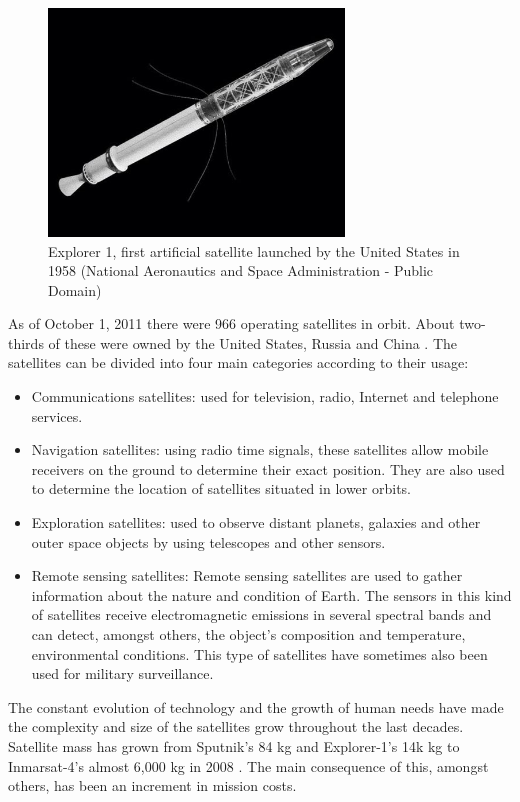 \begin{figure}[H]
\centerline{\includegraphics[width=0.7\textwidth]{images/explorer1.jpg}}
\caption{Explorer 1, first artificial satellite launched by the United States in 1958 (National Aeronautics and Space Administration - Public Domain)}
\label{f1.2}
\end{figure}
\pagebreak

As of October 1, 2011 there were 966 operating satellites in orbit. About two-thirds of these were owned by the United States, Russia and China \cite{SBFE}. The satellites can be divided into four main categories according to their usage:
\begin{itemize}
\item Communications satellites: used for television, radio, Internet and telephone services.
\item Navigation satellites: using radio time signals, these satellites allow mobile receivers on the ground to determine their exact position. They are also used to determine the location of satellites situated in lower orbits.
\item Exploration satellites: used to observe distant planets, galaxies and other outer space objects by using telescopes and other sensors.
\item Remote sensing satellites: Remote sensing satellites are used to gather information about the nature and condition of Earth. The sensors in this kind of satellites receive electromagnetic emissions in several spectral bands and can detect, amongst others, the object's composition and temperature, environmental conditions. This type of satellites have sometimes also been used for military surveillance.

\end{itemize}

The constant evolution of technology and the growth of human needs have made the complexity and size of the satellites grow throughout the last decades. Satellite mass has grown from Sputnik's 84 kg and Explorer-1's 14k kg to Inmarsat-4's almost 6,000 kg in 2008 \cite{BARN}. The main consequence of this, amongst others, has been an increment in mission costs.\\

